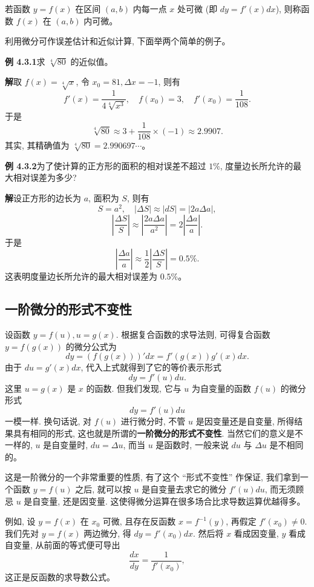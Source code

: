 \documentclass[UTF8,12pt,a4paper,fontset=fandol]{ctexart}
\begin{document}
若函数 $y=f(x)$ 在区间 $(a,b)$ 内每一点 $x$ 处可微 (即 $dy=f'(x)dx$), 则称函数 $f(x)$ 在 $(a,b)$ 内可微。

利用微分可作误差估计和近似计算, 下面举两个简单的例子。

\noindent\textbf{例 4.3.1}\quad 求 $\sqrt[4]{80}$ 的近似值。

\noindent\textbf{解}\quad 取 $f(x)=\sqrt[4]{x}$, 令 $x_0=81,\Delta x=-1$, 则有
\[
  f'(x)=\frac{1}{4\sqrt[4]{x^3}},
  \quad
  f(x_0)=3,
  \quad
  f'(x_0)=\frac{1}{108}.
\]
于是
\[
  \sqrt[4]{80}\approx 3+\frac{1}{108}\times(-1)\approx2.9907.
\]
其实, 其精确值为 $\sqrt[4]{80}=2.990697\cdots$。

\noindent\textbf{例 4.3.2}\quad 为了使计算的正方形的面积的相对误差不超过 $1\%$, 度量边长所允许的最大相对误差为多少?

\noindent\textbf{解}\quad 设正方形的边长为 $a$, 面积为 $S$, 则有
\[
  S=a^2,\quad |\Delta S|\approx |dS|=|2a\Delta a|,
\]
\[
  \left|\frac{\Delta S}{S}\right|
  \approx
  \left|\frac{2a\Delta a}{a^2}\right|
  =
  2\left|\frac{\Delta a}{a}\right|.
\]
于是
\[
  \left|\frac{\Delta a}{a}\right|
  \approx
  \frac{1}{2}\left|\frac{\Delta S}{S}\right|
  =
  0.5\%.
\]
这表明度量边长所允许的最大相对误差为 $0.5\%$。

\subsection{一阶微分的形式不变性}

设函数 $y=f(u),u=g(x)$. 根据复合函数的求导法则, 可得复合函数 $y=f(g(x))$ 的微分公式为
\[
  dy=(f(g(x)))'dx=f'(g(x))g'(x)dx.
\]
由于 $du=g'(x)dx$, 代入上式就得到了它的等价表示形式
\[
  dy=f'(u)du.
\]
这里 $u=g(x)$ 是 $x$ 的函数. 但我们发现, 它与 $u$ 为自变量的函数 $f(u)$ 的微分形式
\[
  dy=f'(u)du
\]
一模一样. 换句话说, 对 $f(u)$ 进行微分时, 不管 $u$ 是因变量还是自变量, 所得结果具有相同的形式, 这也就是所谓的\textbf{一阶微分的形式不变性}. 当然它们的意义是不一样的, $u$ 是自变量时, $du=\Delta u$, 而当 $u$ 是函数时, 一般来说 $du$ 与 $\Delta u$ 是不相同的。

这是一阶微分的一个非常重要的性质, 有了这个 ``形式不变性'' 作保证, 我们拿到一个函数 $y=f(u)$ 之后, 就可以按 $u$ 是自变量去求它的微分 $f'(u)du$, 而无须顾忌 $u$ 是自变量, 还是因变量. 这使得微分运算在很多场合比求导数运算优越得多。

例如, 设 $y=f(x)$ 在 $x_0$ 可微, 且存在反函数 $x=f^{-1}(y)$, 再假定 $f'(x_0)\ne0$. 我们先对 $y=f(x)$ 两边微分, 得 $dy=f'(x_0)dx$. 然后将 $x$ 看成因变量, $y$ 看成自变量, 从前面的等式便可导出
\[
  \frac{dx}{dy}=\frac{1}{f'(x_0)},
\]
这正是反函数的求导数公式。
\end{document}
